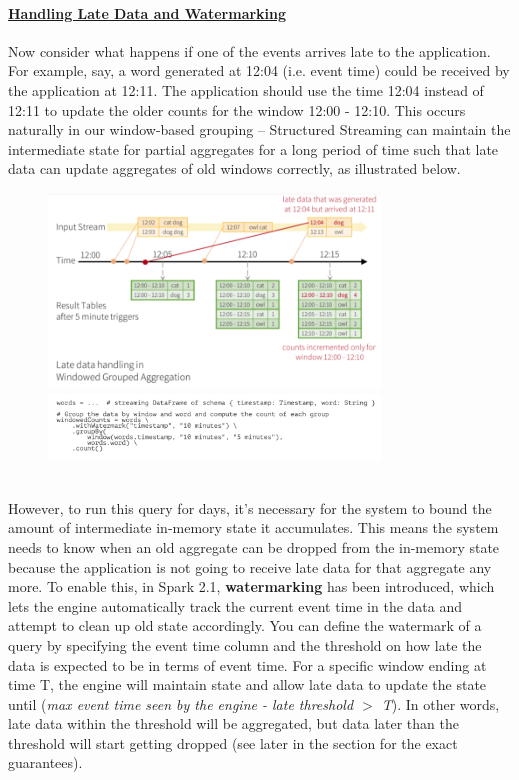 \documentclass[10pt,a4paper]{article}
\begin{document}
  \paragraph{\uline{Handling Late Data and Watermarking}} 
  Now consider what happens if one of the events arrives late to the application. For example, say, a word generated at 12:04 (i.e. event time) could be received by the application at 12:11. The application should use the time 12:04 instead of 12:11 to update the older counts for the window 12:00 - 12:10. This occurs naturally in our window-based grouping – Structured Streaming can maintain the intermediate state for partial aggregates for a long period of time such that late data can update aggregates of old windows correctly, as illustrated below.
  \begin{figure}[ht!]
 \hfill \includegraphics[width=250pt]{images/spark-streaming-late-data}
 \hspace*{\fill}
 \center 
  \hfill \includegraphics[width=250pt]{images/spark-streaming-late-ex}
 \hspace*{\fill}
 \end{figure} \\
 However, to run this query for days, it’s necessary for the system to bound the amount of intermediate in-memory state it accumulates. This means the system needs to know when an old aggregate can be dropped from the in-memory state because the application is not going to receive late data for that aggregate any more. To enable this, in Spark 2.1, \textbf{watermarking} has been introduced, which lets the engine automatically track the current event time in the data and attempt to clean up old state accordingly. You can define the watermark of a query by specifying the event time column and the threshold on how late the data is expected to be in terms of event time. For a specific window ending at time T, the engine will maintain state and allow late data to update the state until (\textit{max event time seen by the engine - late threshold $>$ T}). In other words, late data within the threshold will be aggregated, but data later than the threshold will start getting dropped (see later in the section for the exact guarantees).
\end{document}
